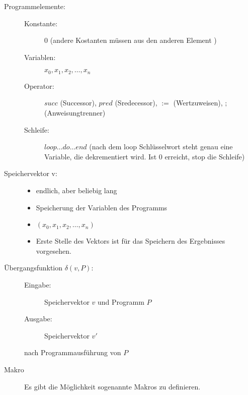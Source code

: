 \documentclass{lehramt-informatik-haupt}
\begin{document}
\begin{description}
\item[Programmelemente:] \strut

\begin{description}
\item[Konstante:]
$0$ (andere Kostanten müssen aus den anderen Element )

\item[Variablen:]
$x_0, x_1, x_2, \dots, x_n$

\item[Operator:]

$succ$ (Successor), $pred$ (Sredecessor), $:=$ (Wertzuweisen), $;$ (Anweisungtrenner)

\item[Schleife:]

$loop \dots do \dots end$ (nach dem loop Schlüsselwort steht genau eine
Variable, die dekrementiert wird. Ist 0 erreicht, stop die Schleife)
\end{description}

\item[Speichervektor v:] \strut

\begin{itemize}
\item endlich, aber beliebig lang
\item Speicherung der Variablen des Programms
\item $(x_0, x_1, x_2, \dots, x_n)$
\item Erste Stelle des Vektors ist für das Speichern des Ergebnisses vorgesehen.
\end{itemize}

\item[Übergangsfunktion $\delta(v, P)$:] \strut

\begin{description}
\item[Eingabe:] Speichervektor $v$ und Programm $P$
\item[Ausgabe:] Speichervektor $v'$
\end{description}

nach Programmausführung von $P$

\item[Makro] \strut

Es gibt die Möglichkeit sogenannte Makros zu definieren.
\end{description}

%

\end{document}
